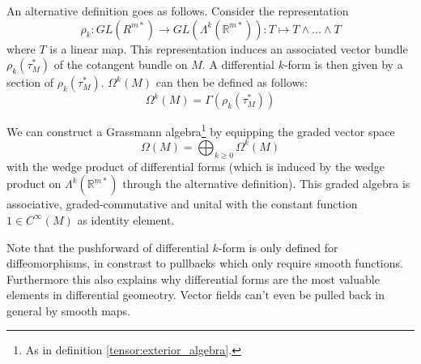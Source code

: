 	\begin{adefinition}
		An alternative definition goes as follows. Consider the representation \[\rho_k:GL(R^{m*})\rightarrow GL(\Lambda^k(\mathbb{R}^{m*})): T\mapsto T\wedge...\wedge T\] where $T$ is a linear map. This representation induces an associated vector bundle\footnotemark\ $\rho_k(\tau_M^*)$ of the cotangent bundle on $M$. A differential $k$-form is then given by a section of $\rho_k(\tau_M^*)$. $\Omega^k(M)$ can then be defined as follows: \[\Omega^k(M) = \Gamma(\rho_k(\tau_M^*))\]
	\end{adefinition}
	
	\begin{construct}
		We can construct a Grassmann algebra\footnote{As in definition \ref{tensor:exterior_algebra}.} by equipping the graded vector space
		\begin{equation}
			\Omega(M) = \bigoplus_{k\geq0}\Omega^k(M)
		\end{equation}
		with the wedge product of differential forms (which is induced by the wedge product on $\Lambda^k(\mathbb{R}^{m*})$ through the alternative definition). This graded algebra is associative, graded-commutative and unital with the constant function $1\in C^{\infty}(M)$ as identity element.
	\end{construct}

	\begin{remark*}
		Note that the pushforward of differential $k$-form is only defined for diffeomorphisms, in constrast to pullbacks which only require smooth functions. Furthermore this also explains why differential forms are the most valuable elements in differential geomeotry. Vector fields can't even be pulled back in general by smooth maps.
	\end{remark*}
	
